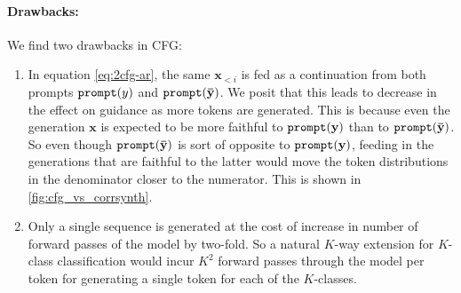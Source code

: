 \paragraph{Drawbacks:} We find two drawbacks in CFG:
\begin{enumerate}
    \item In equation \eqref{eq:2cfg-ar}, the same $\mathbf{x}_{<i}$ is fed as a continuation from both prompts $\mathtt{prompt}(y)$ and $\mathtt{prompt}(\mathbf{\bar{\mathbf{y}}})$. We posit that this leads to decrease in the effect on guidance as more tokens are generated. This is because even the generation $\mathbf{x}$ is expected to be more faithful to $\mathtt{prompt}(\mathbf{y})$ than to $\mathtt{prompt}(\mathbf{\bar{\mathbf{y}}})$. So even though $\mathtt{prompt}(\mathbf{\bar{\mathbf{y}}})$ is sort of opposite to $\mathtt{prompt}(\mathbf{y})$, feeding in the generations that are faithful to the latter would move the token distributions in the denominator closer to the numerator. This is shown in \autoref{fig:cfg_vs_corrsynth}.
    \item Only a single sequence is generated at the cost of increase in number of forward passes of the model by two-fold. So a natural $K$-way extension for $K$-class classification would incur $K^2$ forward passes through the model per token for generating a single token for each of the $K$-classes. 
\end{enumerate}


% 
